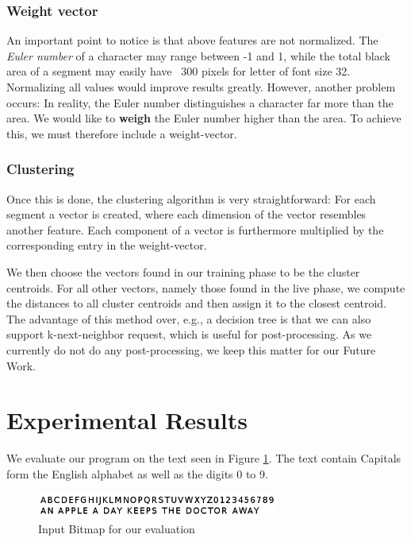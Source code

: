 \documentclass{article}
\begin{document}
\subsubsection{Weight vector}
An important point to notice is that above features are not normalized. The \textit{Euler number} of a character may range between -1 and 1, while the total black area of a segment may easily have ~300 pixels for letter of font size 32. Normalizing all values would improve results greatly. However, another problem occurs: In reality, the Euler number distinguishes a character far more than the area. We would like to \textbf{weigh} the Euler number higher than the area. To achieve this, we must therefore include a weight-vector. 

\subsubsection{Clustering}

Once this is done, the clustering algorithm is very straightforward: For each segment a vector is created, where each dimension of the vector resembles another feature. Each component of a vector is furthermore multiplied by the corresponding entry in the weight-vector. 

We then choose the vectors found in our training phase to be the cluster centroids. For all other vectors, namely those found in the live phase, we compute the distances to all cluster centroids and then assign it to the closest centroid. The advantage of this method over, e.g., a decision tree is that we can also support k-next-neighbor request, which is useful for post-processing. As we currently do not do any post-processing, we keep this matter for our Future Work.

\section{Experimental Results}

We evaluate our program on the text seen in Figure \ref{fig:input}. The text contain Capitals form the English alphabet as well as the digits 0 to 9.

\begin{figure}[ht]
 \includegraphics[width=8cm]{images/demo.png}
 \caption{Input Bitmap for our evaluation}
 \label{fig:input}
\end{figure}
\end{document}
